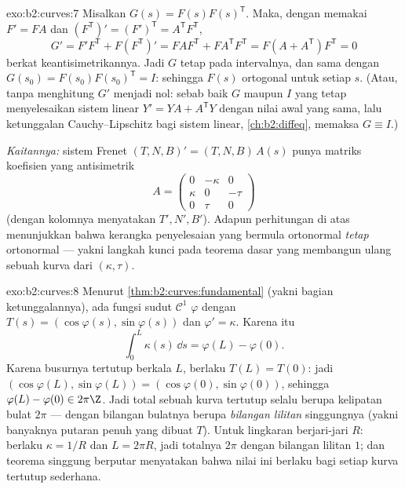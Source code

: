 \begin{solution}{exo:b2:curves:7}
Misalkan $G(s) = F(s)F(s)^{\mathsf T}$. Maka, dengan memakai $F' = FA$ dan
$(F^{\mathsf T})' = (F')^{\mathsf T} = A^{\mathsf T}F^{\mathsf T}$,
\[
G' = F'F^{\mathsf T} + F(F^{\mathsf T})'
= FAF^{\mathsf T} + FA^{\mathsf T}F^{\mathsf T}
= F(A + A^{\mathsf T})F^{\mathsf T} = 0
\]
berkat keantisimetrikannya. Jadi $G$ tetap pada intervalnya, dan sama dengan
$G(s_0) = F(s_0)F(s_0)^{\mathsf T} = I$: sehingga $F(s)$ ortogonal untuk
setiap $s$. (Atau, tanpa menghitung $G'$ menjadi nol: sebab baik
$G$ maupun $I$ yang tetap menyelesaikan sistem linear $Y' = YA +
A^{\mathsf T}Y$ dengan nilai awal yang sama, lalu ketunggalan Cauchy--Lipschitz
bagi sistem linear, \cref{ch:b2:diffeq}, memaksa $G
\equiv I$.)

\emph{Kaitannya:} sistem Frenet $(T, N, B)' = (T, N, B)\,A(s)$
punya matriks koefisien yang antisimetrik
\[
A = \begin{pmatrix} 0 & -\kappa & 0\\ \kappa & 0 & -\tau\\
0 & \tau & 0\end{pmatrix}
\]
(dengan kolomnya menyatakan $T', N', B'$). Adapun perhitungan di atas menunjukkan
bahwa kerangka penyelesaian yang bermula ortonormal \emph{tetap}
ortonormal --- yakni langkah kunci pada teorema dasar yang
membangun ulang sebuah kurva dari $(\kappa, \tau)$.
\end{solution}

\begin{solution}{exo:b2:curves:8}
Menurut \cref{thm:b2:curves:fundamental} (yakni bagian ketunggalannya), ada
fungsi sudut $\mathcal{C}^1$ $\varphi$ dengan $T(s) =
(\cos\varphi(s), \sin\varphi(s))$ dan $\varphi' = \kappa$. Karena itu
\[
\int_0^L \kappa(s)\,\dd s = \varphi(L) - \varphi(0) .
\]
Karena busurnya tertutup berkala $L$, berlaku $T(L) = T(0)$:
jadi $(\cos\varphi(L), \sin\varphi(L)) = (\cos\varphi(0),
\sin\varphi(0))$, sehingga $\varphi(L) - \varphi(0) \in 2\pi\Z$. Jadi
 total sebuah kurva tertutup selalu berupa kelipatan bulat
$2\pi$ --- dengan bilangan bulatnya berupa \emph{bilangan lilitan}
singgungnya (yakni banyaknya putaran penuh yang dibuat $T$). Untuk
lingkaran berjari-jari $R$: berlaku $\kappa = 1/R$ dan $L = 2\pi R$, jadi 
totalnya $2\pi$ dengan bilangan lilitan $1$; dan teorema singgung
berputar menyatakan bahwa nilai ini berlaku bagi setiap kurva tertutup sederhana.
\end{solution}

